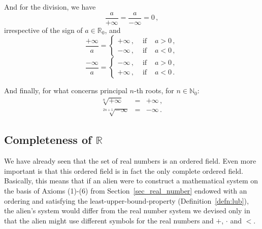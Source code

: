 And for the division, we have
$$
\dfrac{a}{+\infty} = \dfrac{a}{-\infty} = 0\,,
$$
irrespective of the sign of $a\in\mathbb{R}_0$, and
$$
\dfrac{+\infty}{a}=\left\{\begin{array}{lcl}
+\infty\,,&\mbox{ if }&a>0\,,\\
-\infty\,,&\mbox{ if }&a<0\,,\end{array}\right.
$$
$$
\dfrac{-\infty}{a}=\left\{\begin{array}{lcl}
-\infty\,,&\mbox{ if }&a>0\,,\\
+\infty\,,&\mbox{ if }&a<0\,.\end{array}\right.
$$
%

And finally, for what concerns principal $n$-th roots, for $n\in\mathbb{N}_0$:
\begin{eqnarray*}
	\sqrt[n]{+\infty}&=&+\infty\,,\\
	\sqrt[2n+1]{-\infty}&=&-\infty\,.
\end{eqnarray*}

\ifcourse
\ifanalysis

	\subsection{Completeness of $\mathbb{R}$}
	We have already seen that the set of real numbers is an ordered field. Even more important is that this ordered field is in fact the
	only complete ordered field. Basically, this means that if an alien were to construct a mathematical system on the basis of Axioms (1)-(6) from Section~\ref{sec_real_number} endowed with an ordering and satisfying the least-upper-bound-property (Definition~\ref{defn:lub}), the alien's system would differ from the real number system we devised only in that the alien might use different symbols for the real numbers and $+$, $\cdot$ and $<$.
	
